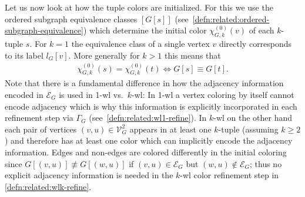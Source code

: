 Let us now look at how the tuple colors are initialized.
For this we use the ordered subgraph equivalence classes $[G[s]]$ (see~\cref{defn:related:ordered-subgraph-equivalence}) which determine the initial color $\chi_{G,k}^{(0)}(v)$ of each $k$-tuple $s$.
For $k = 1$ the equivalence class of a single vertex $v$ directly corresponds to its label $l_G[v]$.
More generally for $k > 1$ this means that
\begin{align}
	\chi_{G,k}^{(0)}(s) = \chi_{G,k}^{(0)}(t) \iff G[s] \equiv G[t] \text{.} \label{eq:related:wlk-init}
\end{align}
Note that there is a fundamental difference in how the adjacency information encoded in $\mathcal{E}_G$ is used in 1-\acs{wl} vs.\ $k$-\acs{wl}:
In 1-\acs{wl} a vertex coloring by itself cannot encode adjacency which is why this information is explicitly incorporated in each refinement step via $\Gamma_G$ (see~\cref{defn:related:wl1-refine}).
In $k$-\acs{wl} on the other hand each pair of vertices $(v, u) \in \mathcal{V}_G^2$ appears in at least one $k$-tuple (assuming $k \geq 2$) and therefore has at least one color which can implicitly encode the adjacency information.
Edges and non-edges are colored differently in the initial coloring since $G[(v, u)] \not\equiv G[(w, u)]$ if $(v, u) \in \mathcal{E}_G$ but $(w, u) \notin \mathcal{E}_G$;
thus no explicit adjacency information is needed in the $k$-\acs{wl} color refinement step in \cref{defn:related:wlk-refine}.

